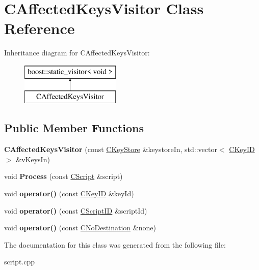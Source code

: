 \hypertarget{class_c_affected_keys_visitor}{}\section{C\+Affected\+Keys\+Visitor Class Reference}
\label{class_c_affected_keys_visitor}
Inheritance diagram for C\+Affected\+Keys\+Visitor\+:\begin{figure}[H]
\begin{center}
\leavevmode
\includegraphics[height=2.000000cm]{class_c_affected_keys_visitor}
\end{center}
\end{figure}
\subsection*{Public Member Functions}
\begin{DoxyCompactItemize}
\item 
\mbox{\label{class_c_affected_keys_visitor_a97f7f932abb21ae791993a284183ab89}} 
{\bfseries C\+Affected\+Keys\+Visitor} (const \mbox{\hyperlink{class_c_key_store}{C\+Key\+Store}} \&keystore\+In, std\+::vector$<$ \mbox{\hyperlink{class_c_key_i_d}{C\+Key\+ID}} $>$ \&v\+Keys\+In)
\item 
\mbox{\label{class_c_affected_keys_visitor_a749859ce2a826e2d60c8fe31685efae3}} 
void {\bfseries Process} (const \mbox{\hyperlink{class_c_script}{C\+Script}} \&script)
\item 
\mbox{\label{class_c_affected_keys_visitor_abc13269c85eb964555cfe23c60b8c9b1}} 
void {\bfseries operator()} (const \mbox{\hyperlink{class_c_key_i_d}{C\+Key\+ID}} \&key\+Id)
\item 
\mbox{\label{class_c_affected_keys_visitor_a01b52c5a4311ae3985d1e5753e033215}} 
void {\bfseries operator()} (const \mbox{\hyperlink{class_c_script_i_d}{C\+Script\+ID}} \&script\+Id)
\item 
\mbox{\label{class_c_affected_keys_visitor_abeff400fed1ba87283930538f9164640}} 
void {\bfseries operator()} (const \mbox{\hyperlink{class_c_no_destination}{C\+No\+Destination}} \&none)
\end{DoxyCompactItemize}


The documentation for this class was generated from the following file\+:\begin{DoxyCompactItemize}
\item 
script.\+cpp\end{DoxyCompactItemize}
